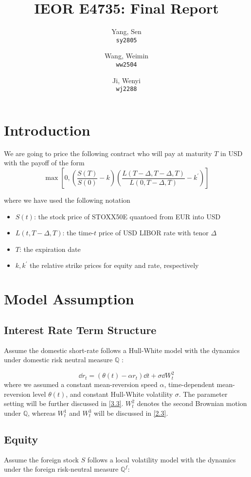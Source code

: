 \documentclass[11pt]{article}
\title{IEOR E4735: Final Report}
\author{
    Yang, Sen\\
    \texttt{sy2805}
    \and
    Wang, Weimin\\
    \texttt{ww2504}
    \and
    Ji, Wenyi\\
    \texttt{wj2288}
    }
\date{}
\numberwithin{equation}{section}
\theoremstyle{remark}
\begin{document}
\maketitle

\tableofcontents

\section{Introduction}\label{S1}
We are going to price the following contract who will pay at maturity $T$ in USD with the payoff of the form
$$\max\left[0,\left(\frac{S(T)}{S(0)}-k\right)\left(\frac{L(T-\Delta,T-\Delta,T)}{L(0,T-\Delta,T)}-k^\prime\right)\right]$$

where we have used the following notation
\begin{itemize}
\item $S(t)$: the stock price of STOXX50E quantoed from EUR into USD
\item $L(t, T-\Delta, T)$: the time-$t$ price of USD LIBOR rate with tenor $\Delta$
\item $T$: the expiration date
\item $k, k^\prime$ the relative strike prices for equity and rate, respectively
\end{itemize}

\section{Model Assumption}\label{2}
\subsection{Interest Rate Term Structure}\label{2.1}
Assume the domestic short-rate follows a Hull-White model with the dynamics under domestic risk neutral measure $\mathbb{Q}$ :

$$ \dd r_t = \left(\theta(t)-\alpha r_t \right) \dd t + \sigma \dd W_t^2 $$
where we assumed a constant mean-reversion speed $\alpha$, time-dependent mean-reversion level $\theta(t)$, and constant Hull-White volatility $\sigma$. The parameter setting will be further discussed in \ref{3.3}. $W_t^2$ denotes the second Brownian motion under $\mathbb{Q}$, whereas $W_t^1$ and $W_t^3$ will be discussed in \ref{2.3}.

\subsection{Equity}\label{2.2}
Assume the foreign stock $S$ follows a local volatility model with the dynamics under the foreign risk-neutral measure $\mathbb{Q}^f$:
\end{document}

